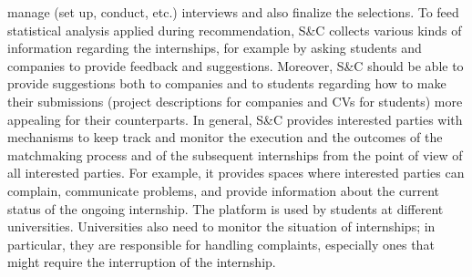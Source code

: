 \documentclass [11pt,twoside]{article}
\begin{document}
manage (set up, conduct, etc.) interviews and also finalize the selections.
To feed statistical analysis applied during recommendation, S\&C collects various kinds of information
regarding the internships, for example by asking students and companies to provide feedback and
suggestions.
Moreover, S\&C should be able to provide suggestions both to companies and to students regarding
how to make their submissions (project descriptions for companies and CVs for students) more
appealing for their counterparts.
In general, S\&C provides interested parties with mechanisms to keep track and monitor the execution
and the outcomes of the matchmaking process and of the subsequent internships from the point of
view of all interested parties. For example, it provides spaces where interested parties can complain,
communicate problems, and provide information about the current status of the ongoing internship.
The platform is used by students at different universities. Universities also need to monitor the situation
of internships; in particular, they are responsible for handling complaints, especially ones that might
require the interruption of the internship.
    
\end{document}
